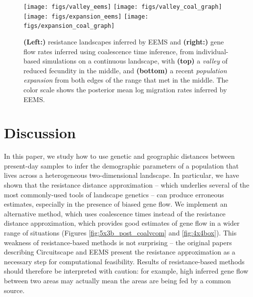 \documentclass{article}
\begin{document}
\begin{figure}
\centering
    \texttt{[image: figs/valley\_eems]}
    \texttt{[image: figs/valley\_coal\_graph]}
    \texttt{[image: figs/expansion\_eems]}
    \texttt{[image: figs/expansion\_coal\_graph]}
    \caption{
        \textbf{(Left:)}
        resistance landscapes inferred by EEMS
        and 
        \textbf{(right:)}
        gene flow rates inferred using coalescence time inference,
        from individual-based simulations on a continuous landscape,
        with \textbf{(top)} a \emph{valley} of reduced fecundity in the middle, and
        \textbf{(bottom)} a recent \emph{population expansion} from both edges of the range
        that met in the middle.
        The color scale shows the posterior mean log migration rates inferred by EEMS.
        \label{fig:more_barriers}
    }
\end{figure}


\section*{Discussion}

In this paper, we study how to 
use genetic and geographic distances between present-day samples
to infer the demographic parameters of a population that lives across
a heterogeneous two-dimensional landscape.
In particular, we have shown that the resistance distance approximation
-- which underlies several of the most commonly-used tools of landscape genetics --
can produce erroneous estimates, especially in the presence of biased gene flow.
We implement an alternative method, 
which uses coalescence times instead of the resistance distance approximation,
which provides good estimates of gene flow in a wider range of situations
(Figures \ref{fig:5x3b_post_coalvcom} and \ref{fig:4x4box}).
This weakness of resistance-based methods is not surprising --
the original papers 
describing Circuitscape \citep{mcrae2006isolation} and EEMS \citep{petkova2016visualizing}
present the resistance approximation as a necessary step for computational feasibility.
Results of resistance-based methods should therefore be interpreted with caution:
for example, high inferred gene flow between two areas
may actually mean the areas are being fed by a common source.
\end{document}
